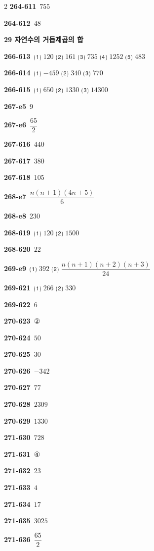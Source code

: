 \documentclass[10pt,a4paper]{article}
\begin{document}
\begin{multicols}{2}
\noindent\textbf{264-611}\ $755$\par
\noindent\textbf{264-612}\ $48$\par
\noindent\textbf{29 자연수의 거듭제곱의 합}\par\smallskip
\noindent\textbf{266-613}\ ⑴ $120$ ⑵ $161$ ⑶ $735$ ⑷ $1252$ ⑸ $483$\par
\noindent\textbf{266-614}\ ⑴ $-459$ ⑵ $340$ ⑶ $770$\par
\noindent\textbf{266-615}\ ⑴ $650$ ⑵ $1330$ ⑶ $14300$\par
\noindent\textbf{267-e5}\ $9$\par
\noindent\textbf{267-e6}\ $\dfrac{65}{2}$\par
\noindent\textbf{267-616}\ $440$\par
\noindent\textbf{267-617}\ $380$\par
\noindent\textbf{267-618}\ $105$\par
\noindent\textbf{268-e7}\ $\dfrac{n(n+1)(4n+5)}{6}$\par
\noindent\textbf{268-e8}\ $230$\par
\noindent\textbf{268-619}\ ⑴ $120$ ⑵ $1500$\par
\noindent\textbf{268-620}\ $22$\par
\noindent\textbf{269-e9}\ ⑴ $392$ ⑵ $\dfrac{n(n+1)(n+2)(n+3)}{24}$\par
\noindent\textbf{269-621}\ ⑴ $266$ ⑵ $330$\par
\noindent\textbf{269-622}\ $6$\par
\noindent\textbf{270-623}\ ②\par
\noindent\textbf{270-624}\ $50$\par
\noindent\textbf{270-625}\ $30$\par
\noindent\textbf{270-626}\ $-342$\par
\noindent\textbf{270-627}\ $77$\par
\noindent\textbf{270-628}\ $2309$\par
\noindent\textbf{270-629}\ $1330$\par
\noindent\textbf{271-630}\ $728$\par
\noindent\textbf{271-631}\ ④\par
\noindent\textbf{271-632}\ $23$\par
\noindent\textbf{271-633}\ $4$\par
\noindent\textbf{271-634}\ $17$\par
\noindent\textbf{271-635}\ $3025$\par
\noindent\textbf{271-636}\ $\dfrac{65}{2}$\par

\end{multicols}
\end{document}
